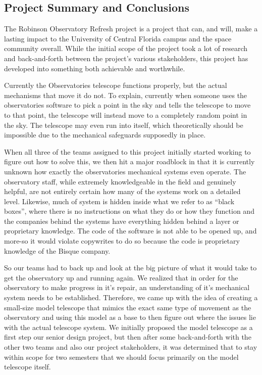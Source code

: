 \documentclass[12pt]{report}
\begin{document}
\begin{enumerate}
\section*{Project Summary and Conclusions}

The Robinson Observatory Refresh project is a project that can, and will, make a lasting impact to the University of Central Florida campus and the space community overall. While the initial scope of the project took a lot of research and back-and-forth between the project’s various stakeholders, this project has developed into something both achievable and worthwhile.

Currently the Observatories telescope functions properly, but the actual mechanisms that move it do not. To explain, currently when someone uses the observatories software to pick a point in the sky and tells the telescope to move to that point, the telescope will instead move to a completely random point in the sky. The telescope may even run into itself, which theoretically should be impossible due to the mechanical safeguards supposedly in place.

When all three of the teams assigned to this project initially started working to figure out how to solve this, we then hit a major roadblock in that it is currently unknown how exactly the observatories mechanical systems even operate. The observatory staff, while extremely knowledgeable in the field and genuinely helpful, are not entirely certain how many of the systems work on a detailed level. Likewise, much of system is hidden inside what we refer to as “black boxes”, where there is no instructions on what they do or how they function and the companies behind the systems have everything hidden behind a layer or proprietary knowledge. The code of the software is not able to be opened up, and more-so it would violate copywrites to do so because the code is proprietary knowledge of the Bisque company.

So our teams had to back up and look at the big picture of what it would take to get the observatory up and running again. We realized that in order for the observatory to make progress in it’s repair, an understanding of it’s mechanical system needs to be established. Therefore, we came up with the idea of creating a small-size model telescope that mimics the exact same type of movement as the observatory and using this model as a base to then figure out where the issues lie with the actual telescope system. We initially proposed the model telescope as a first step our senior design project, but then after some back-and-forth with the other two teams and also our project stakeholders, it was determined that to stay within scope for two semesters that we should focus primarily on the model telescope itself.


\end{enumerate}
\end{document}
